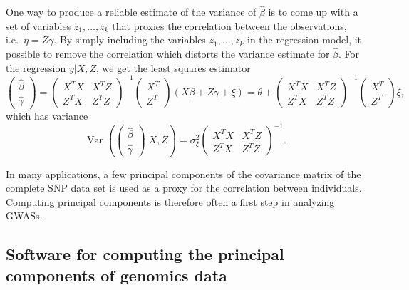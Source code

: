 \documentclass[review]{siamart0516}
\DeclareMathOperator{\Var}{Var}
\begin{document}
One way to produce a reliable estimate of the variance of $\hat{\beta}$ is to come up with a set of variables $z_1,\dots,z_k$ that proxies the correlation between the observations, i.e.\ $\eta=Z\gamma$. By simply including the variables $z_1,\dots,z_k$ in the regression model, it possible to remove the correlation which distorts the variance estimate for $\hat{\beta}$. For the regression $y|X,Z$, we get the least squares estimator
\begin{equation*}
    \begin{pmatrix}\hat{\beta} \\ \hat{\gamma}\end{pmatrix} =
    \begin{pmatrix}
        X^TX & X^TZ \\ Z^TX & Z^TZ
    \end{pmatrix}^{-1}\!\!
    \begin{pmatrix}
        X^T \\ Z^T
    \end{pmatrix}
    (X\beta + Z\gamma + \xi)=
    \theta +
            \begin{pmatrix}
        X^TX & X^TZ \\ Z^TX & Z^TZ
    \end{pmatrix}^{-1}\!\!
    \begin{pmatrix}
        X^T \\ Z^T
    \end{pmatrix}\xi,
\end{equation*}
which has variance
\begin{equation*}
    \Var\left(\begin{pmatrix}\hat{\beta} \\ \hat{\gamma}\end{pmatrix}|X,Z\right)=\sigma_\xi^2
        \begin{pmatrix} X^TX & X^TZ \\ Z^TX & Z^TZ \end{pmatrix}^{-1}.
\end{equation*}

In many applications, a few principal components of the covariance matrix of the complete SNP data set is used as a proxy for the correlation between individuals. Computing principal components is therefore often a first step in analyzing GWASs.


\subsection{Software for computing the principal components of genomics data}
\end{document}
